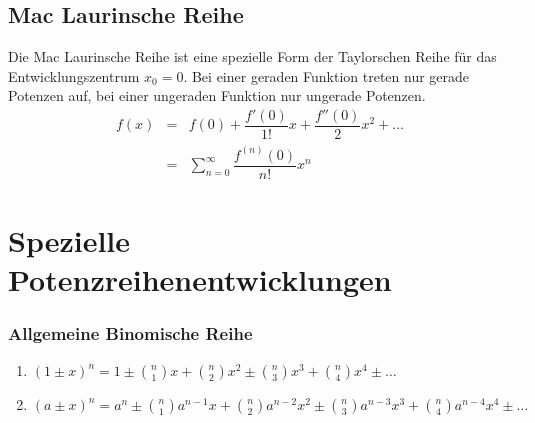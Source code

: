 \subsection{Mac Laurinsche Reihe}
Die Mac Laurinsche Reihe ist eine spezielle Form der Taylorschen Reihe für das Entwicklungszentrum $x_0=0$. Bei einer geraden Funktion treten nur gerade Potenzen auf, bei einer ungeraden Funktion nur ungerade Potenzen.
\begin{equation}
\boxed{
\begin{array}{lll}
f\left(x\right)&=&f\left(0\right)+\dfrac{f'\left(0\right)}{1!}x+\dfrac{f''\left(0\right)}{2}x^2+\dotso\\
&=&\displaystyle \sum_{n=0}^{\infty}\dfrac{f^{\left(n\right)}\left(0\right)}{n!}x^n
\end{array}
}
\end{equation}
\section{Spezielle Potenzreihenentwicklungen}
\subsubsection{Allgemeine Binomische Reihe}
\begin{enumerate}[$(a)$]
\item $\left(1\pm x\right)^n=1\pm \displaystyle \binom{n}{1}x+\displaystyle \binom{n}{2}x^2\pm \displaystyle \binom{n}{3}x^3+\displaystyle \binom{n}{4}x^4\pm \dotso$
\item $\left(a\pm x\right)^n=a^n\pm \displaystyle \binom{n}{1}a^{n-1}x+\displaystyle \binom{n}{2}a^{n-2}x^2\pm \displaystyle \binom{n}{3}a^{n-3}x^3+\displaystyle \binom{n}{4}a^{n-4}x^4\pm \dotso$
\end{enumerate}
